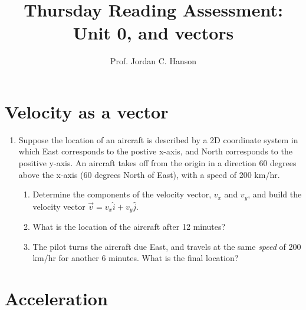 \documentclass{article}
\begin{document}
\title{Thursday Reading Assessment: Unit 0, and vectors}
\author{Prof. Jordan C. Hanson}

\maketitle

\section{Velocity as a vector}

\begin{enumerate}
\item Suppose the location of an aircraft is described by a 2D coordinate system in which East corresponds to the postive x-axis, and North corresponds to the positive y-axis.  An aircraft takes off from the origin in a direction 60 degrees above the x-axis (60 degrees North of East), with a speed of 200 km/hr.
\begin{enumerate}
\item Determine the components of the velocity vector, $v_x$ and $v_y$, and build the velocity vector $\vec{v} = v_x \hat{i} + v_y \hat{j}$. \\ \vspace{0.5cm}
\item What is the location of the aircraft after 12 minutes? \\ \vspace{0.5cm}
\item The pilot turns the aircraft due East, and travels at the same \textit{speed} of 200 km/hr for another 6 minutes.  What is the final location? \\ \vspace{0.5cm}
\end{enumerate}
\end{enumerate}

\section{Acceleration}
\end{document}
